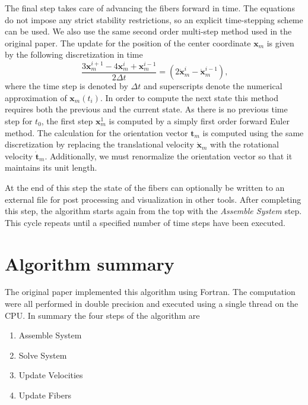 \documentclass[a4paper,11pt]{kth-mag}
\begin{document}
The final step takes care of advancing the fibers forward in time. The equations do not impose any strict stability restrictions, so an explicit time-stepping scheme can be used. We also use the same second order multi-step method used in the original paper. The update for the position of the center coordinate $\mathbf{x}_m$ is given by the following discretization in time
\begin{equation}
  \label{eq:time_discretization}
  \frac{3\mathbf{x}_m^{i+1} - 4\mathbf{x}_m^{i} + \mathbf{x}_m^{i-1}}{2 \Delta t} = (2\mathbf{\dot{x}}_m^{i} - \mathbf{\dot{x}}_m^{i-1}) \text{,}
\end{equation}
where the time step is denoted by $\Delta t$ and superscripts denote the numerical approximation of $\mathbf{x}_m(t_i)$. In order to compute the next state this method requires both the previous and the current state. As there is no previous time step for $t_0$, the first step $\mathbf{x}_{m}^{1}$ is computed by a simply first order forward Euler method. The calculation for the orientation vector $\mathbf{t}_m$ is computed using the same discretization by replacing the translational velocity $\mathbf{\dot{x}}_m$ with the rotational velocity $\mathbf{\dot{t}}_m$. Additionally, we must renormalize the orientation vector so that it maintains its unit length.

At the end of this step the state of the fibers can optionally be written to an external file for post processing and visualization in other tools. After completing this step, the algorithm starts again from the top with the \emph{Assemble System} step. This cycle repeats until a specified number of time steps have been executed.

\section{Algorithm summary}
\label{sec:algorithm_summary}

The original paper implemented this algorithm using Fortran. The computation were all performed in double precision and executed using a single thread on the CPU. In summary the four steps of the algorithm are
\begin{enumerate}
  \item Assemble System
  \item Solve System
  \item Update Velocities
  \item Update Fibers
\end{enumerate}
\end{document}
